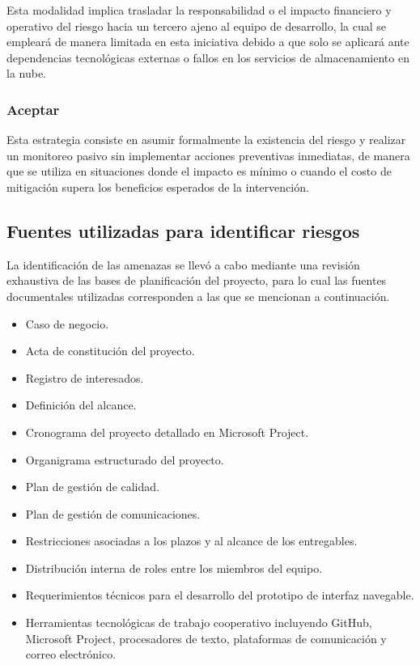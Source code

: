\documentclass[11pt,spanish]{article}
\begin{document}
Esta modalidad implica trasladar la responsabilidad o el impacto financiero y operativo del riesgo hacia un tercero ajeno al equipo de desarrollo, la cual se empleará de manera limitada en esta iniciativa debido a que solo se aplicará ante dependencias tecnológicas externas o fallos en los servicios de almacenamiento en la nube.

\subsubsection{Aceptar}

Esta estrategia consiste en asumir formalmente la existencia del riesgo y realizar un monitoreo pasivo sin implementar acciones preventivas inmediatas, de manera que se utiliza en situaciones donde el impacto es mínimo o cuando el costo de mitigación supera los beneficios esperados de la intervención.

\subsection{Fuentes utilizadas para identificar riesgos}

La identificación de las amenazas se llevó a cabo mediante una revisión exhaustiva de las bases de planificación del proyecto, para lo cual las fuentes documentales utilizadas corresponden a las que se mencionan a continuación.

\begin{itemize}[leftmargin=*, label={\textbullet}]
    \item Caso de negocio.
    \item Acta de constitución del proyecto.
    \item Registro de interesados.
    \item Definición del alcance.
    \item Cronograma del proyecto detallado en Microsoft Project.
    \item Organigrama estructurado del proyecto.
    \item Plan de gestión de calidad.
    \item Plan de gestión de comunicaciones.
    \item Restricciones asociadas a los plazos y al alcance de los entregables.
    \item Distribución interna de roles entre los miembros del equipo.
    \item Requerimientos técnicos para el desarrollo del prototipo de interfaz navegable.
    \item Herramientas tecnológicas de trabajo cooperativo incluyendo GitHub, Microsoft Project, procesadores de texto, plataformas de comunicación y correo electrónico.
\end{itemize}
\end{document}
